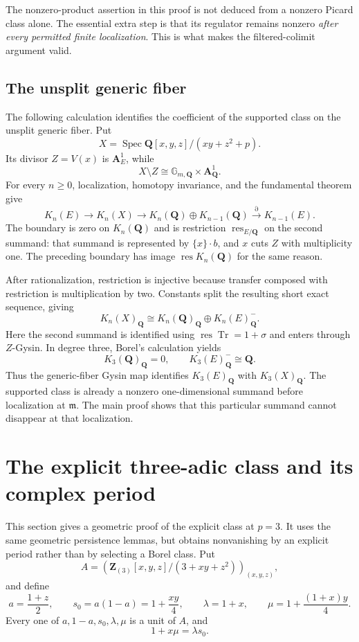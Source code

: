 \documentclass[11pt,a4paper]{amsart}
\numberwithin{equation}{section}
\theoremstyle{definition}
\theoremstyle{remark}
\newcommand{\Q}{\mathbf Q}
\newcommand{\Z}{\mathbf Z}
\newcommand{\A}{\mathbf A}
\newcommand{\m}{\mathfrak m}
\newcommand{\Spec}{\operatorname{Spec}}
\newcommand{\Qrat}{_{\Q}}
\begin{document}
The nonzero-product assertion in this proof is not deduced from a nonzero Picard class alone. The essential extra step is that its regulator remains nonzero \emph{after every permitted finite localization}. This is what makes the filtered-colimit argument valid.

\subsection{The unsplit generic fiber}

The following calculation identifies the coefficient of the supported class on the unsplit generic fiber. Put
\[
X=\Spec\Q[x,y,z]/(xy+z^2+p).
\]
Its divisor $Z=V(x)$ is $\A^1_E$, while
\[
X\setminus Z\cong\mathbb G_{m,\Q}\times\A^1_{\Q}.
\]
For every $n\geq 0$, localization, homotopy invariance, and the fundamental theorem give
\[
K_n(E)\longrightarrow K_n(X)\longrightarrow
K_n(\Q)\oplus K_{n-1}(\Q)
\xrightarrow{\partial}K_{n-1}(E).
\]
The boundary is zero on $K_n(\Q)$ and is restriction $\operatorname{res}_{E/\Q}$ on the second summand: that summand is represented by $\{x\}\cdot b$, and $x$ cuts $Z$ with multiplicity one. The preceding boundary has image $\operatorname{res}K_n(\Q)$ for the same reason.

After rationalization, restriction is injective because transfer composed with restriction is multiplication by two. Constants split the resulting short exact sequence, giving
\begin{equation}\label{d3:eq:genericdecomposition}
K_n(X)\Qrat\cong K_n(\Q)\Qrat\oplus K_n(E)\Qrat^{-}.
\end{equation}
Here the second summand is identified using $\operatorname{res}\operatorname{Tr}=1+\sigma$ and enters through $Z$-Gysin. In degree three, Borel's calculation \cite[Proposition~12.2]{Borel} yields
\[
K_3(\Q)\Qrat=0,\qquad K_3(E)\Qrat^{-}\cong\Q.
\]
Thus the generic-fiber Gysin map identifies $K_3(E)\Qrat$ with $K_3(X)\Qrat$. The supported class is already a nonzero one-dimensional summand before localization at $\m$. The main proof shows that this particular summand cannot disappear at that localization.

\section{The explicit three-adic class and its complex period}\label{d3:sec:explicit}

This section gives a geometric proof of the explicit class at $p=3$. It uses the same geometric persistence lemmas, but obtains nonvanishing by an explicit period rather than by selecting a Borel class. Put
\[
A=\left(\Z_{(3)}[x,y,z]/(3+xy+z^2)\right)_{(x,y,z)},
\]
and define
\[
a=\frac{1+z}{2},\qquad s_0=a(1-a)=1+\frac{xy}{4},\qquad
\lambda=1+x,\qquad \mu=1+\frac{(1+x)y}{4}.
\]
Every one of $a,1-a,s_0,\lambda,\mu$ is a unit of $A$, and
\begin{equation}\label{d3:eq:unitsidentity}
1+x\mu=\lambda s_0.
\end{equation}
\end{document}
